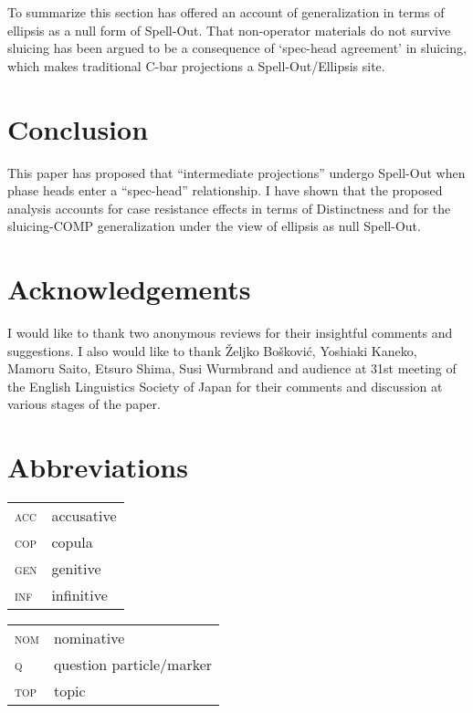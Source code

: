 \documentclass[output=paper]{langscibook}
\begin{document}
To summarize this section has offered an account of  generalization in terms of ellipsis as a null form of Spell-Out. That non-operator materials do not survive sluicing has been argued to be a consequence of `spec-head agreement' in sluicing, which makes traditional C-bar projections a Spell-Out/Ellipsis site.

\section{Conclusion}\label{aranosect5}
This paper has proposed that  ``intermediate projections'' undergo Spell-Out when phase heads enter a ``spec-head'' relationship. I have shown that the proposed analysis accounts for case resistance effects in terms of Distinctness and for the sluicing-COMP generalization under the view of ellipsis as null Spell-Out.

\section*{Acknowledgements}
I would like to thank two anonymous reviews for their insightful comments and suggestions. I also would like to thank Željko Bošković, Yoshiaki Kaneko, Mamoru Saito, Etsuro Shima, Susi Wurmbrand and audience at 31st meeting of the English Linguistics Society of Japan for their comments and discussion at various stages of the paper. 

\section*{Abbreviations}
\begin{tabularx}{.5\textwidth}{@{}lQ}
\textsc{acc} & accusative\\
\textsc{cop} & copula \\
\textsc{gen} & genitive \\
\textsc{inf} & infinitive\\
\end{tabularx}\begin{tabularx}{.5\textwidth}{lQ@{}}
\textsc{nom} & nominative\\
\textsc{q} & question particle/marker\\
\textsc{top} & topic\\
\end{tabularx}

{\sloppy\printbibliography[heading=subbibliography,notkeyword=this]}
\end{document}
